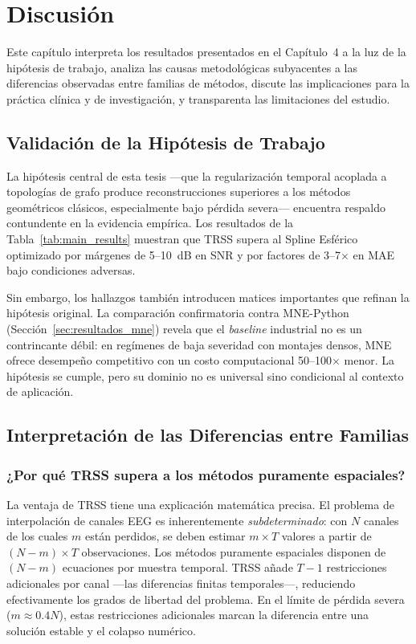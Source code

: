 \chapter{Discusión}

Este capítulo interpreta los resultados presentados en el Capítulo~4 a la luz de la hipótesis de trabajo, analiza las causas metodológicas subyacentes a las diferencias observadas entre familias de métodos, discute las implicaciones para la práctica clínica y de investigación, y transparenta las limitaciones del estudio.

\section{Validación de la Hipótesis de Trabajo}

La hipótesis central de esta tesis —que la regularización temporal acoplada a topologías de grafo produce reconstrucciones superiores a los métodos geométricos clásicos, especialmente bajo pérdida severa— encuentra respaldo contundente en la evidencia empírica. Los resultados de la Tabla~\ref{tab:main_results} muestran que TRSS supera al Spline Esférico optimizado por márgenes de 5--10~dB en SNR y por factores de 3--7$\times$ en MAE bajo condiciones adversas.

Sin embargo, los hallazgos también introducen matices importantes que refinan la hipótesis original. La comparación confirmatoria contra MNE-Python (Sección~\ref{sec:resultados_mne}) revela que el \textit{baseline} industrial no es un contrincante débil: en regímenes de baja severidad con montajes densos, MNE ofrece desempeño competitivo con un costo computacional 50--100$\times$ menor. La hipótesis se cumple, pero su dominio no es universal sino condicional al contexto de aplicación.

\section{Interpretación de las Diferencias entre Familias}

\subsection{¿Por qué TRSS supera a los métodos puramente espaciales?}

La ventaja de TRSS tiene una explicación matemática precisa. El problema de interpolación de canales EEG es inherentemente \textit{subdeterminado}: con $N$ canales de los cuales $m$ están perdidos, se deben estimar $m \times T$ valores a partir de $(N-m) \times T$ observaciones. Los métodos puramente espaciales disponen de $(N-m)$ ecuaciones por muestra temporal. TRSS añade $T-1$ restricciones adicionales por canal —las diferencias finitas temporales—, reduciendo efectivamente los grados de libertad del problema. En el límite de pérdida severa ($m \approx 0.4N$), estas restricciones adicionales marcan la diferencia entre una solución estable y el colapso numérico.

